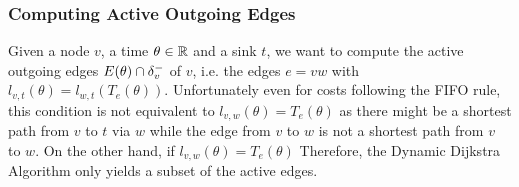 \subsubsection*{Computing Active Outgoing Edges}

Given a node $v$, a time $\theta\in\mathbb{R}$ and a sink $t$, we want to compute the active outgoing edges $E(\theta) \cap \delta^-_{v}$ of $v$, i.e. the edges $e=vw$ with $l_{v,t}(\theta) = l_{w,t}(T_e(\theta))$.
Unfortunately even for costs following the FIFO rule, this condition is not equivalent to $l_{v,w}(\theta) = T_e(\theta)$ as there might be a shortest path from  $v$ to $t$ via $w$ while the edge from $v$ to $w$ is not a shortest path from $v$ to $w$.
On the other hand, if $l_{v,w}(\theta) = T_e(\theta)$
Therefore, the Dynamic Dijkstra Algorithm only yields a subset of the active edges. 